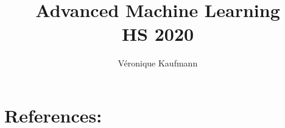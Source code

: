 \documentclass[9pt,a4paper,fleqn,portrait]{scrartcl}
\title{Advanced Machine Learning \\ 
			{HS 2020}
		}
\author{V\'{e}ronique Kaufmann}
\begin{document}
	

\begin{multicols*}{4}
	{\footnotesize 
		\tableofcontents
	}
	\listoftodos
	\columnbreak
	
	\section*{References: }
	{\footnotesize
		
	}
\end{multicols*}	
\newpage	


\begin{multicols*}{3}
	\maketitle
				
	 		
		
				
		 
		
			
				
		
		
	
	
	
	
	

\end{multicols*}
\end{document}
